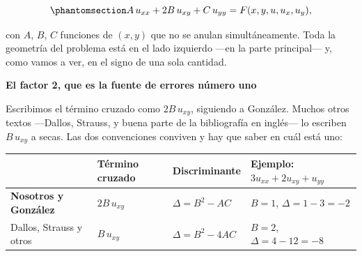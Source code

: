 \documentclass[
  spanish,
  a4paper,
]{scrbook}
\newcounter{none} %
\theoremstyle{definition}
\theoremstyle{plain}
\theoremstyle{definition}
\theoremstyle{plain}
\theoremstyle{definition}
\theoremstyle{remark}
\begin{document}
\begin{equation}\protect\phantomsection\label{eq-general}{
A\,u_{xx} + 2B\,u_{xy} + C\,u_{yy} = F(x, y, u, u_x, u_y),
}\end{equation}

con \(A\), \(B\), \(C\) funciones de \((x,y)\) que no se anulan
simultáneamente. Toda la geometría del problema está en el lado
izquierdo ---en la parte principal--- y, como vamos a ver, en el signo
de una sola cantidad.

\begin{tcolorbox}[enhanced jigsaw, arc=.35mm, bottomrule=.15mm, breakable, colback=white, colframe=quarto-callout-warning-color-frame, left=2mm, leftrule=.75mm, opacityback=0, rightrule=.15mm, toprule=.15mm]
\begin{minipage}[t]{5.5mm}
\textcolor{quarto-callout-warning-color}{\faExclamationTriangle}
\end{minipage}%
\begin{minipage}[t]{\textwidth - 5.5mm}

\vspace{-3mm}\textbf{El factor 2, que es la fuente de errores número uno}\vspace{3mm}

Escribimos el término cruzado como \(2B\,u_{xy}\), siguiendo a González.
Muchos otros textos ---Dallos, Strauss, y buena parte de la bibliografía
en inglés--- lo escriben \(B\,u_{xy}\) a secas. Las dos convenciones
conviven y hay que saber en cuál está uno:

{\def\LTcaptype{none} %
\begin{longtable}[]{@{}
  >{\raggedright\arraybackslash}p{}
  >{\raggedright\arraybackslash}p{}
  >{\raggedright\arraybackslash}p{}
  >{\raggedright\arraybackslash}p{}@{}}
\toprule\noalign{}
\begin{minipage}[b]{\linewidth}\raggedright
\end{minipage} & \begin{minipage}[b]{\linewidth}\raggedright
Término cruzado
\end{minipage} & \begin{minipage}[b]{\linewidth}\raggedright
Discriminante
\end{minipage} & \begin{minipage}[b]{\linewidth}\raggedright
Ejemplo: \(3u_{xx}+2u_{xy}+u_{yy}\)
\end{minipage} \\
\midrule\noalign{}
\endhead
\bottomrule\noalign{}
\endlastfoot
\textbf{Nosotros y González} & \(2B\,u_{xy}\) & \(\Delta = B^2 - AC\) &
\(B=1\), \(\Delta = 1-3 = -2\) \\
Dallos, Strauss y otros & \(B\,u_{xy}\) & \(\Delta = B^2 - 4AC\) &
\(B=2\), \(\Delta = 4-12 = -8\) \\
\end{longtable}
}


\end{minipage}
\end{tcolorbox}
\end{document}
